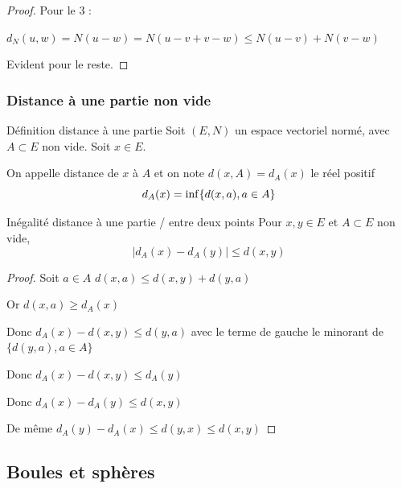 
\begin{proof}

    Pour le 3 : 

    $d_N(u, w) = N(u - w) = N( u - v + v - w) \leqslant N(u - v) + N(v - w)$

    Evident pour le reste.
\end{proof}



\subsubsection{Distance à une partie non vide}

\begin{definition}{Définition distance à une partie}{}
    Soit $(E, N)$ un espace vectoriel normé, avec $A \subset E$ non vide. 
    Soit $x \in E$. 

    On appelle distance de $x$ à $A$ et on note $d(x, A) = d_A(x)$ le réel positif
    $$d_A(x) = \inf \space \{d(x, a), a \in A\}$$
\end{definition}

\begin{proposition}{Inégalité distance à une partie / entre deux points}{}
    Pour $x, y \in E$ et $A \subset E$ non vide, 
    $$\mid d_A(x) - d_A(y)\mid \leqslant d(x, y)$$
\end{proposition}


\begin{proof}
    Soit $a \in A$ $d(x, a) \leqslant d(x, y) + d(y, a)$

    Or $d(x, a) \geqslant d_A(x)$

    Donc $d_A(x) - d(x, y) \leqslant d(y, a)$ avec le terme de gauche le minorant de
    $\{d(y, a), a \in A\}$

    Donc $d_A(x) - d(x, y) \leqslant d_A(y)$

    Donc $d_A(x) - d_A(y) \leqslant d(x, y)$

    De même $d_A(y) - d_A(x) \leqslant d(y, x) \leqslant d(x, y)$
\end{proof}

\subsection{Boules et sphères}

